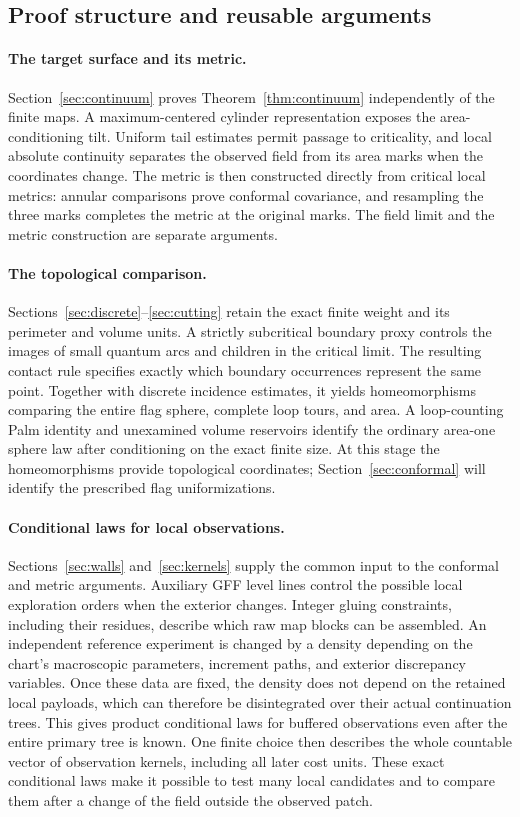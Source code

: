 \subsection{Proof structure and reusable arguments}

\paragraph{The target surface and its metric.}
Section~\ref{sec:continuum} proves Theorem~\ref{thm:continuum}
independently of the finite maps. A maximum-centered cylinder
representation exposes the area-conditioning tilt. Uniform tail estimates
permit passage to criticality, and local absolute continuity separates the
observed field from its area marks when the coordinates change. The metric
is then constructed directly from critical local metrics: annular
comparisons prove conformal covariance, and resampling the three marks
completes the metric at the original marks. The field limit and the metric
construction are separate arguments.

\paragraph{The topological comparison.}
Sections~\ref{sec:discrete}--\ref{sec:cutting} retain the exact finite
weight and its perimeter and volume units. A strictly subcritical boundary
proxy controls the images of small quantum arcs and children in the
critical limit. The resulting contact rule specifies exactly which
boundary occurrences represent the same point. Together with discrete
incidence estimates, it yields homeomorphisms comparing the entire flag
sphere, complete loop tours, and area. A loop-counting Palm identity and
unexamined volume reservoirs identify the ordinary area-one sphere law
after conditioning on the exact finite size. At this stage the
homeomorphisms provide topological coordinates; Section~\ref{sec:conformal}
will identify the prescribed flag uniformizations.

\paragraph{Conditional laws for local observations.}
Sections~\ref{sec:walls} and~\ref{sec:kernels} supply the common input
to the conformal and metric arguments. Auxiliary GFF level lines control
the possible local exploration orders when the exterior changes. Integer
gluing constraints, including their residues, describe which raw map
blocks can be assembled. An independent reference experiment is changed
by a density depending on the chart's macroscopic parameters, increment
paths, and exterior discrepancy variables. Once these data are fixed,
the density does not depend on the retained local payloads, which can
therefore be disintegrated over their actual continuation trees. This gives product
conditional laws for buffered observations even after the entire primary
tree is known. One finite choice then describes the whole countable vector
of observation kernels, including all later cost units. These exact
conditional laws make it possible to test many local candidates and to
compare them after a change of the field outside the observed patch.

